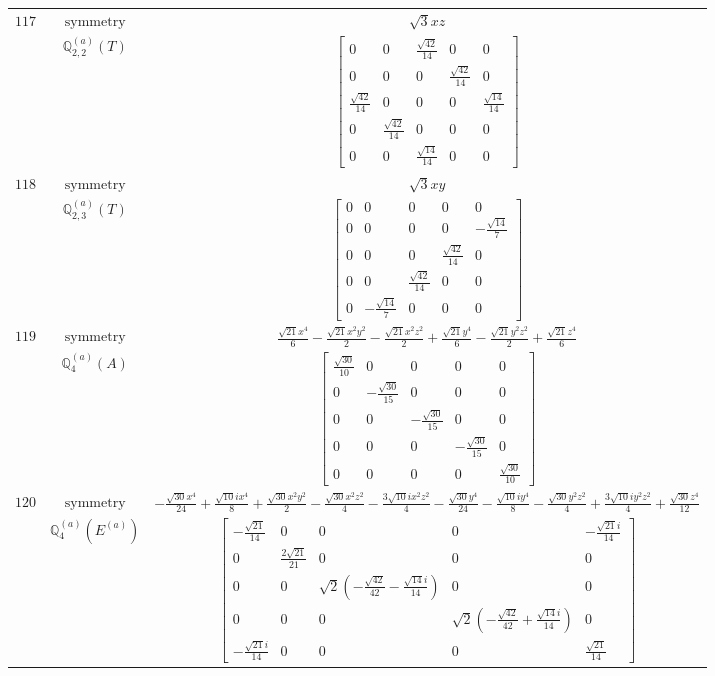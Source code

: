 \documentclass[fleqn,8pt,landscape]{jsarticle}
\begin{document}
\begin{longtable}{ccc}
$ 117 $ & $ \text{symmetry} $ & $ \sqrt{3} x z $ \\
$  $ & $ \mathbb{Q}_{2,2}^{(a)}(T) $ & $ \begin{bmatrix} 0 & 0 & \frac{\sqrt{42}}{14} & 0 & 0 \\ 0 & 0 & 0 & \frac{\sqrt{42}}{14} & 0 \\ \frac{\sqrt{42}}{14} & 0 & 0 & 0 & \frac{\sqrt{14}}{14} \\ 0 & \frac{\sqrt{42}}{14} & 0 & 0 & 0 \\ 0 & 0 & \frac{\sqrt{14}}{14} & 0 & 0 \end{bmatrix} $ \\ \hline
$ 118 $ & $ \text{symmetry} $ & $ \sqrt{3} x y $ \\
$  $ & $ \mathbb{Q}_{2,3}^{(a)}(T) $ & $ \begin{bmatrix} 0 & 0 & 0 & 0 & 0 \\ 0 & 0 & 0 & 0 & - \frac{\sqrt{14}}{7} \\ 0 & 0 & 0 & \frac{\sqrt{42}}{14} & 0 \\ 0 & 0 & \frac{\sqrt{42}}{14} & 0 & 0 \\ 0 & - \frac{\sqrt{14}}{7} & 0 & 0 & 0 \end{bmatrix} $ \\ \hline
$ 119 $ & $ \text{symmetry} $ & $ \frac{\sqrt{21} x^{4}}{6} - \frac{\sqrt{21} x^{2} y^{2}}{2} - \frac{\sqrt{21} x^{2} z^{2}}{2} + \frac{\sqrt{21} y^{4}}{6} - \frac{\sqrt{21} y^{2} z^{2}}{2} + \frac{\sqrt{21} z^{4}}{6} $ \\
$  $ & $ \mathbb{Q}_{4}^{(a)}(A) $ & $ \begin{bmatrix} \frac{\sqrt{30}}{10} & 0 & 0 & 0 & 0 \\ 0 & - \frac{\sqrt{30}}{15} & 0 & 0 & 0 \\ 0 & 0 & - \frac{\sqrt{30}}{15} & 0 & 0 \\ 0 & 0 & 0 & - \frac{\sqrt{30}}{15} & 0 \\ 0 & 0 & 0 & 0 & \frac{\sqrt{30}}{10} \end{bmatrix} $ \\ \hline
$ 120 $ & $ \text{symmetry} $ & $ - \frac{\sqrt{30} x^{4}}{24} + \frac{\sqrt{10} i x^{4}}{8} + \frac{\sqrt{30} x^{2} y^{2}}{2} - \frac{\sqrt{30} x^{2} z^{2}}{4} - \frac{3 \sqrt{10} i x^{2} z^{2}}{4} - \frac{\sqrt{30} y^{4}}{24} - \frac{\sqrt{10} i y^{4}}{8} - \frac{\sqrt{30} y^{2} z^{2}}{4} + \frac{3 \sqrt{10} i y^{2} z^{2}}{4} + \frac{\sqrt{30} z^{4}}{12} $ \\
$  $ & $ \mathbb{Q}_{4}^{(a)}(E^{(a)}) $ & $ \begin{bmatrix} - \frac{\sqrt{21}}{14} & 0 & 0 & 0 & - \frac{\sqrt{21} i}{14} \\ 0 & \frac{2 \sqrt{21}}{21} & 0 & 0 & 0 \\ 0 & 0 & \sqrt{2} \left(- \frac{\sqrt{42}}{42} - \frac{\sqrt{14} i}{14}\right) & 0 & 0 \\ 0 & 0 & 0 & \sqrt{2} \left(- \frac{\sqrt{42}}{42} + \frac{\sqrt{14} i}{14}\right) & 0 \\ - \frac{\sqrt{21} i}{14} & 0 & 0 & 0 & \frac{\sqrt{21}}{14} \end{bmatrix} $ \\ \hline

\end{longtable}
\end{document}
